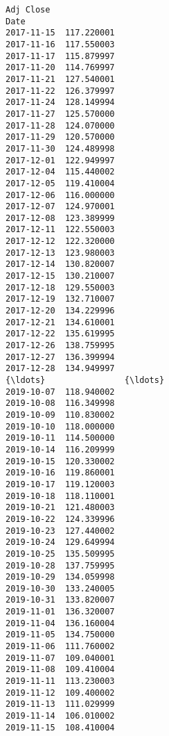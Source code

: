 \documentclass[11pt]{article}
\begin{document}
\begin{Verbatim}[commandchars=\\\{\}]
             Adj Close  
Date                    
2017-11-15  117.220001  
2017-11-16  117.550003  
2017-11-17  115.879997  
2017-11-20  114.769997  
2017-11-21  127.540001  
2017-11-22  126.379997  
2017-11-24  128.149994  
2017-11-27  125.570000  
2017-11-28  124.070000  
2017-11-29  120.570000  
2017-11-30  124.489998  
2017-12-01  122.949997  
2017-12-04  115.440002  
2017-12-05  119.410004  
2017-12-06  116.000000  
2017-12-07  124.970001  
2017-12-08  123.389999  
2017-12-11  122.550003  
2017-12-12  122.320000  
2017-12-13  123.980003  
2017-12-14  130.820007  
2017-12-15  130.210007  
2017-12-18  129.550003  
2017-12-19  132.710007  
2017-12-20  134.229996  
2017-12-21  134.610001  
2017-12-22  135.619995  
2017-12-26  138.759995  
2017-12-27  136.399994  
2017-12-28  134.949997  
{\ldots}                {\ldots}  
2019-10-07  118.940002  
2019-10-08  116.349998  
2019-10-09  110.830002  
2019-10-10  118.000000  
2019-10-11  114.500000  
2019-10-14  116.209999  
2019-10-15  120.330002  
2019-10-16  119.860001  
2019-10-17  119.120003  
2019-10-18  118.110001  
2019-10-21  121.480003  
2019-10-22  124.339996  
2019-10-23  127.440002  
2019-10-24  129.649994  
2019-10-25  135.509995  
2019-10-28  137.759995  
2019-10-29  134.059998  
2019-10-30  133.240005  
2019-10-31  133.820007  
2019-11-01  136.320007  
2019-11-04  136.160004  
2019-11-05  134.750000  
2019-11-06  111.760002  
2019-11-07  109.040001  
2019-11-08  109.410004  
2019-11-11  113.230003  
2019-11-12  109.400002  
2019-11-13  111.029999  
2019-11-14  106.010002  
2019-11-15  108.410004  


\end{Verbatim}
\end{document}
